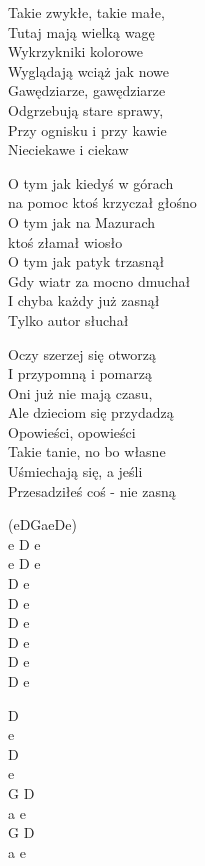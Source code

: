 \begin{text}
    \ifchorded{\hfill\break}
    Takie zwykłe, takie małe,\\
    Tutaj mają wielką wagę\\
    Wykrzykniki kolorowe\\
    Wyglądają wciąż jak nowe\\
    Gawędziarze, gawędziarze\\
    Odgrzebują stare sprawy,\\
    Przy ognisku i przy kawie\\
    Nieciekawe i ciekaw

    \vin O tym jak kiedyś w górach\\
    \vin na pomoc ktoś krzyczał głośno\\
    \vin O tym jak na Mazurach\\
    \vin ktoś złamał wiosło\\
    \vin O tym jak patyk trzasnął\\
    \vin Gdy wiatr za mocno dmuchał\\
    \vin I chyba każdy już zasnął\\
    \vin Tylko autor słuchał

    Oczy szerzej się otworzą\\
    I przypomną i pomarzą\\
    Oni już nie mają czasu,\\
    Ale dzieciom się przydadzą\\
    Opowieści, opowieści\\
    Takie tanie, no bo własne\\
    Uśmiechają się, a jeśli\\
    Przesadziłeś coś - nie zasną
\end{text}
\begin{chord}
    (eDGaeDe)\\
    e D e\\
    e D e\\
    D e\\
    D e\\
    D e\\
    D e\\
    D e\\
    D e

    D\\
    e\\
    D\\
    e\\
    G D\\
    a e\\
    G D\\
    a e
\end{chord}